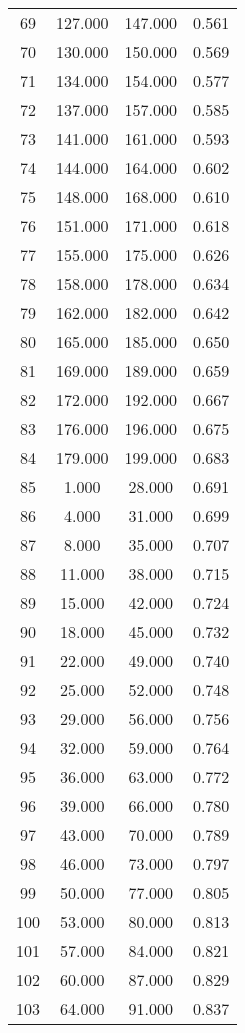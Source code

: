 \begin{tabular}{cccc}
  69 & 127.000 & 147.000 & 0.561 \\ 
  70 & 130.000 & 150.000 & 0.569 \\ 
  71 & 134.000 & 154.000 & 0.577 \\ 
  72 & 137.000 & 157.000 & 0.585 \\ 
  73 & 141.000 & 161.000 & 0.593 \\ 
  74 & 144.000 & 164.000 & 0.602 \\ 
  75 & 148.000 & 168.000 & 0.610 \\ 
  76 & 151.000 & 171.000 & 0.618 \\ 
  77 & 155.000 & 175.000 & 0.626 \\ 
  78 & 158.000 & 178.000 & 0.634 \\ 
  79 & 162.000 & 182.000 & 0.642 \\ 
  80 & 165.000 & 185.000 & 0.650 \\ 
  81 & 169.000 & 189.000 & 0.659 \\ 
  82 & 172.000 & 192.000 & 0.667 \\ 
  83 & 176.000 & 196.000 & 0.675 \\ 
  84 & 179.000 & 199.000 & 0.683 \\ 
  85 & 1.000 & 28.000 & 0.691 \\ 
  86 & 4.000 & 31.000 & 0.699 \\ 
  87 & 8.000 & 35.000 & 0.707 \\ 
  88 & 11.000 & 38.000 & 0.715 \\ 
  89 & 15.000 & 42.000 & 0.724 \\ 
  90 & 18.000 & 45.000 & 0.732 \\ 
  91 & 22.000 & 49.000 & 0.740 \\ 
  92 & 25.000 & 52.000 & 0.748 \\ 
  93 & 29.000 & 56.000 & 0.756 \\ 
  94 & 32.000 & 59.000 & 0.764 \\ 
  95 & 36.000 & 63.000 & 0.772 \\ 
  96 & 39.000 & 66.000 & 0.780 \\ 
  97 & 43.000 & 70.000 & 0.789 \\ 
  98 & 46.000 & 73.000 & 0.797 \\ 
  99 & 50.000 & 77.000 & 0.805 \\ 
  100 & 53.000 & 80.000 & 0.813 \\ 
  101 & 57.000 & 84.000 & 0.821 \\ 
  102 & 60.000 & 87.000 & 0.829 \\ 
  103 & 64.000 & 91.000 & 0.837 \\ 

\end{tabular}
